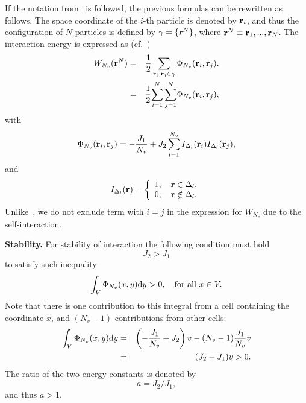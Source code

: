 \documentclass[12pt]{article}
\numberwithin{equation}{section}
\begin{document}
	\begin{mdframed}[linecolor=black,linewidth=1pt,leftline=true]
	If the notation from~\cite{HansenMcDonald13} is followed, the previous formulas can be rewritten as follows. The space coordinate of the $i$-th particle is denoted by $\vb{r}_i$, and thus the configuration of $N$ particles is defined by $\gamma = \{\vb{r}^N\}$, where $\vb{r}^N \equiv \vb{r}_1, ..., \vb{r}_N$. The interaction energy is expressed as (cf.~\cite[eq.~(2.5.16)]{HansenMcDonald13})
	\begin{eqnarray*}
		W_{N_v}(\vb{r}^N) & = & \frac{1}{2} \sum_{\vb{r}_i,\vb{r}_j \in \gamma} \Phi_{N_v} (\vb{r}_i,\vb{r}_j).
		\\
		& = & \frac12 {\sum_{i=1}^N \sum_{j=1}^N} \Phi_{N_v} (\vb{r}_i,\vb{r}_j),
	\end{eqnarray*}
	with
	\begin{equation*}
		\Phi_{N_v}(\vb{r}_i, \vb{r}_j) = -\frac{J_1}{N_v} + J_2\sum_{l=1}^{N_v} I_{\Delta_l}(\vb{r}_i) I_{\Delta_l}(\vb{r}_j),
	\end{equation*}
	and
	\begin{equation*}
		I_{\Delta_l} (\vb{r}) = \left\{
		\begin{array}{ll}
			1, \quad \vb{r} \in \Delta_l,
			\\
			0, \quad \vb{r} \notin \Delta_l.
		\end{array}
		\right.
	\end{equation*}
	Unlike~\cite[eq.~(2.5.16)]{HansenMcDonald13}, we do not exclude term with $i = j$ in the expression for $W_{N_v}$ due to the self-interaction.
	\end{mdframed}
	
	\textbf{Stability.} For stability of interaction the following condition must hold
	\begin{equation*}
		J_2 > J_1
	\end{equation*}
	to satisfy such inequality~\cite{KKD20,Ruelle70}
	\begin{equation}
		\int_{V} \Phi_{N_v}(x,y) {\rm d}y > 0, \quad \text{for all } x \in V.
	\end{equation}
	Note that there is one contribution to this integral from a cell containing the coordinate $x$, and $(N_v - 1)$ contributions from other cells:
	\begin{eqnarray*}
		\int_{V} \Phi_{N_v}(x,y) {\rm d}y & = & \left(-\frac{J_1}{N_v} + J_2\right)v - (N_v - 1) \frac{J_1}{N_v}v
		\\
		& = & (J_2 - J_1)v > 0.
	\end{eqnarray*}
	The ratio of the two energy constants is denoted by
	$$a = J_2/J_1,$$
	and thus $a > 1.$
	
\end{document}

